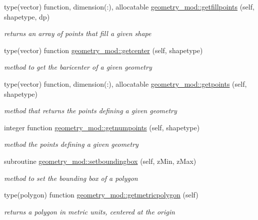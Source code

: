 \begin{DoxyCompactItemize}
type(vector) function, dimension(\+:), allocatable \mbox{\hyperlink{namespacegeometry__mod_a12f7679eb15f32630680f2b8504827b3}{geometry\+\_\+mod\+::getfillpoints}} (self, shapetype, dp)
\begin{DoxyCompactList}\small\item\em returns an array of points that fill a given shape \end{DoxyCompactList}\item 
type(vector) function \mbox{\hyperlink{namespacegeometry__mod_a4a38edbff02aa0ff5f16a16c39bf778e}{geometry\+\_\+mod\+::getcenter}} (self, shapetype)
\begin{DoxyCompactList}\small\item\em method to get the baricenter of a given geometry \end{DoxyCompactList}\item 
type(vector) function, dimension(\+:), allocatable \mbox{\hyperlink{namespacegeometry__mod_a0b1a3c5aa414292ace34d59487082e3a}{geometry\+\_\+mod\+::getpoints}} (self, shapetype)
\begin{DoxyCompactList}\small\item\em method that returns the points defining a given geometry \end{DoxyCompactList}\item 
integer function \mbox{\hyperlink{namespacegeometry__mod_a524c5d28a80fb6729b102126485605ce}{geometry\+\_\+mod\+::getnumpoints}} (self, shapetype)
\begin{DoxyCompactList}\small\item\em method the points defining a given geometry \end{DoxyCompactList}\item 
subroutine \mbox{\hyperlink{namespacegeometry__mod_a41e0a6999c6edccb70fe20ec80d32709}{geometry\+\_\+mod\+::setboundingbox}} (self, z\+Min, z\+Max)
\begin{DoxyCompactList}\small\item\em method to set the bounding box of a polygon \end{DoxyCompactList}\item 
type(polygon) function \mbox{\hyperlink{namespacegeometry__mod_aee5a288df947e30d7e46c37a2f7ca9d2}{geometry\+\_\+mod\+::getmetricpolygon}} (self)
\begin{DoxyCompactList}\small\item\em returns a polygon in metric units, centered at the origin \end{DoxyCompactList}\item 

\end{DoxyCompactItemize}
